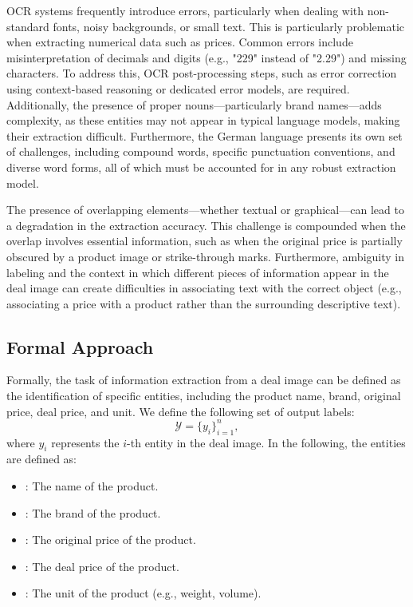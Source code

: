 \documentclass[11pt]{article}
\begin{document}
OCR systems frequently introduce errors, particularly when dealing with non-standard fonts, noisy backgrounds, or small text. This is particularly problematic when extracting numerical data such as prices. Common errors include misinterpretation of decimals and digits (e.g., "229" instead of "2.29") and missing characters. To address this, OCR post-processing steps, such as error correction using context-based reasoning or dedicated error models, are required. Additionally, the presence of proper nouns—particularly brand names—adds complexity, as these entities may not appear in typical language models, making their extraction difficult. Furthermore, the German language presents its own set of challenges, including compound words, specific punctuation conventions, and diverse word forms, all of which must be accounted for in any robust extraction model.

The presence of overlapping elements—whether textual or graphical—can lead to a degradation in the extraction accuracy. This challenge is compounded when the overlap involves essential information, such as when the original price is partially obscured by a product image or strike-through marks. Furthermore, ambiguity in labeling and the context in which different pieces of information appear in the deal image can create difficulties in associating text with the correct object (e.g., associating a price with a product rather than the surrounding descriptive text).

\subsection{Formal Approach}
Formally, the task of information extraction from a deal image can be defined as the identification of specific entities, including the product name, brand, original price, deal price, and unit. We define the following set of output labels:
\begin{equation}
\mathcal{Y} = \{y_{i}\}_{i=1}^{n},
\end{equation}
where \(y_{i}\) represents the $i$-th entity in the deal image. In the following, the entities are defined as:
\begin{itemize}
    \item {}: The name of the product.
    \item {}: The brand of the product.
    \item {}: The original price of the product.
    \item {}: The deal price of the product.
    \item {}: The unit of the product (e.g., weight, volume).
\end{itemize}
\end{document}
